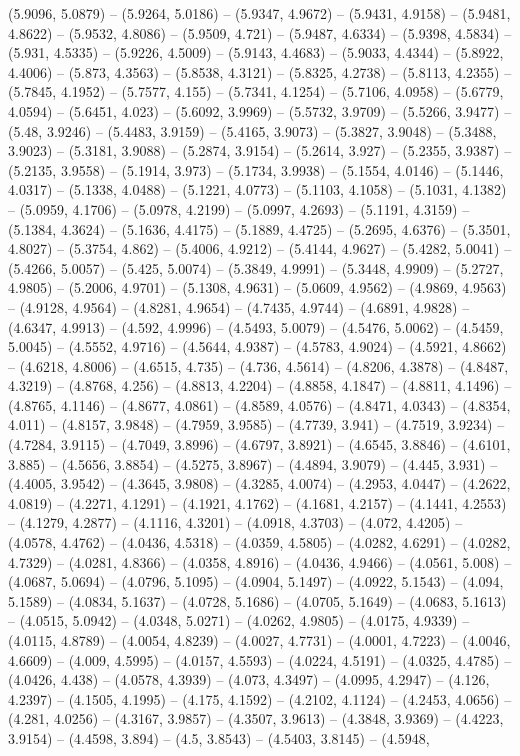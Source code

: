 (5.9096, 5.0879) -- (5.9264, 5.0186) -- (5.9347, 4.9672) -- (5.9431, 4.9158) -- (5.9481, 4.8622) -- (5.9532, 4.8086) -- (5.9509, 4.721) -- (5.9487, 4.6334) -- (5.9398, 4.5834) -- (5.931, 4.5335) -- (5.9226, 4.5009) -- (5.9143, 4.4683) -- (5.9033, 4.4344) -- (5.8922, 4.4006) -- (5.873, 4.3563) -- (5.8538, 4.3121) -- (5.8325, 4.2738) -- (5.8113, 4.2355) -- (5.7845, 4.1952) -- (5.7577, 4.155) -- (5.7341, 4.1254) -- (5.7106, 4.0958) -- (5.6779, 4.0594) -- (5.6451, 4.023) -- (5.6092, 3.9969) -- (5.5732, 3.9709) -- (5.5266, 3.9477) -- (5.48, 3.9246) -- (5.4483, 3.9159) -- (5.4165, 3.9073) -- (5.3827, 3.9048) -- (5.3488, 3.9023) -- (5.3181, 3.9088) -- (5.2874, 3.9154) -- (5.2614, 3.927) -- (5.2355, 3.9387) -- (5.2135, 3.9558) -- (5.1914, 3.973) -- (5.1734, 3.9938) -- (5.1554, 4.0146) -- (5.1446, 4.0317) -- (5.1338, 4.0488) -- (5.1221, 4.0773) -- (5.1103, 4.1058) -- (5.1031, 4.1382) -- (5.0959, 4.1706) -- (5.0978, 4.2199) -- (5.0997, 4.2693) -- (5.1191, 4.3159) -- (5.1384, 4.3624) -- (5.1636, 4.4175) -- (5.1889, 4.4725) -- (5.2695, 4.6376) -- (5.3501, 4.8027) -- (5.3754, 4.862) -- (5.4006, 4.9212) -- (5.4144, 4.9627) -- (5.4282, 5.0041) -- (5.4266, 5.0057) -- (5.425, 5.0074) -- (5.3849, 4.9991) -- (5.3448, 4.9909) -- (5.2727, 4.9805) -- (5.2006, 4.9701) -- (5.1308, 4.9631) -- (5.0609, 4.9562) -- (4.9869, 4.9563) -- (4.9128, 4.9564) -- (4.8281, 4.9654) -- (4.7435, 4.9744) -- (4.6891, 4.9828) -- (4.6347, 4.9913) -- (4.592, 4.9996) -- (4.5493, 5.0079) -- (4.5476, 5.0062) -- (4.5459, 5.0045) -- (4.5552, 4.9716) -- (4.5644, 4.9387) -- (4.5783, 4.9024) -- (4.5921, 4.8662) -- (4.6218, 4.8006) -- (4.6515, 4.735) -- (4.736, 4.5614) -- (4.8206, 4.3878) -- (4.8487, 4.3219) -- (4.8768, 4.256) -- (4.8813, 4.2204) -- (4.8858, 4.1847) -- (4.8811, 4.1496) -- (4.8765, 4.1146) -- (4.8677, 4.0861) -- (4.8589, 4.0576) -- (4.8471, 4.0343) -- (4.8354, 4.011) -- (4.8157, 3.9848) -- (4.7959, 3.9585) -- (4.7739, 3.941) -- (4.7519, 3.9234) -- (4.7284, 3.9115) -- (4.7049, 3.8996) -- (4.6797, 3.8921) -- (4.6545, 3.8846) -- (4.6101, 3.885) -- (4.5656, 3.8854) -- (4.5275, 3.8967) -- (4.4894, 3.9079) -- (4.445, 3.931) -- (4.4005, 3.9542) -- (4.3645, 3.9808) -- (4.3285, 4.0074) -- (4.2953, 4.0447) -- (4.2622, 4.0819) -- (4.2271, 4.1291) -- (4.1921, 4.1762) -- (4.1681, 4.2157) -- (4.1441, 4.2553) -- (4.1279, 4.2877) -- (4.1116, 4.3201) -- (4.0918, 4.3703) -- (4.072, 4.4205) -- (4.0578, 4.4762) -- (4.0436, 4.5318) -- (4.0359, 4.5805) -- (4.0282, 4.6291) -- (4.0282, 4.7329) -- (4.0281, 4.8366) -- (4.0358, 4.8916) -- (4.0436, 4.9466) -- (4.0561, 5.008) -- (4.0687, 5.0694) -- (4.0796, 5.1095) -- (4.0904, 5.1497) -- (4.0922, 5.1543) -- (4.094, 5.1589) -- (4.0834, 5.1637) -- (4.0728, 5.1686) -- (4.0705, 5.1649) -- (4.0683, 5.1613) -- (4.0515, 5.0942) -- (4.0348, 5.0271) -- (4.0262, 4.9805) -- (4.0175, 4.9339) -- (4.0115, 4.8789) -- (4.0054, 4.8239) -- (4.0027, 4.7731) -- (4.0001, 4.7223) -- (4.0046, 4.6609) -- (4.009, 4.5995) -- (4.0157, 4.5593) -- (4.0224, 4.5191) -- (4.0325, 4.4785) -- (4.0426, 4.438) -- (4.0578, 4.3939) -- (4.073, 4.3497) -- (4.0995, 4.2947) -- (4.126, 4.2397) -- (4.1505, 4.1995) -- (4.175, 4.1592) -- (4.2102, 4.1124) -- (4.2453, 4.0656) -- (4.281, 4.0256) -- (4.3167, 3.9857) -- (4.3507, 3.9613) -- (4.3848, 3.9369) -- (4.4223, 3.9154) -- (4.4598, 3.894) -- (4.5, 3.8543) -- (4.5403, 3.8145) -- (4.5948, 